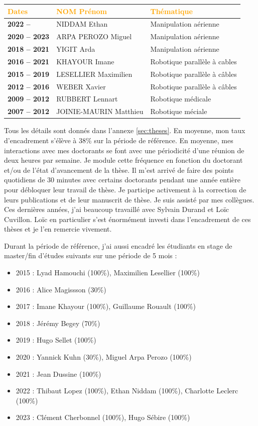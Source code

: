 \documentclass[a4paper,12pt]{article}
\begin{document}
\begin{table}[htbp]
\label{tab:liste_theses}
\centering
\begin{tabular}{>{\bfseries}lll}
\toprule
\textup{\textcolor{orange}{Dates}} & \textcolor{orange}{NOM Prénom} & \textcolor{orange}{Thématique}\\
\midrule
2022 -- & NIDDAM Ethan & Manipulation aérienne\\
2020 -- 2023 & ARPA PEROZO Miguel & Manipulation aérienne\\
2018 -- 2021 & YIGIT Arda & Manipulation aérienne\\
2016 -- 2021 & KHAYOUR Imane & Robotique parallèle à cables\\
2015 -- 2019 & LESELLIER Maximilien & Robotique parallèle à câbles\\
2012 -- 2016 & WEBER Xavier & Robotique parallèle à câbles\\
2009 -- 2012 & RUBBERT Lennart & Robotique médicale\\
2007 -- 2012 & JOINIE-MAURIN Matthieu & Robotique méciale\\
\bottomrule
\end{tabular}
\end{table}

Tous les détails sont donnés dans l'annexe \ref{sec:theses}. En moyenne, mon taux d'encadrement s'élève à 38\% sur la période de référence. En moyenne, mes interactions avec mes doctorants se font avec une périodicité d'une réunion de deux heures par semaine. Je module cette fréquence en fonction du doctorant et/ou de l'état d'avancement de la thèse. Il m'est arrivé de faire des points quotidiens de 30 minutes avec certains doctorants pendant une année entière pour débloquer leur travail de thèse. Je participe activement à la correction de leurs publications et de leur manuscrit de thèse. Je suis assisté par mes collègues. Ces dernières années, j'ai beaucoup travaillé avec Sylvain Durand et Loïc Cuvillon. Loïc en particulier s'est énormément investi dans l'encadrement de ces thèses et je l'en remercie vivement.

Durant la période de référence, j’ai aussi encadré les étudiants en stage de master/fin d’études suivants sur une période de 5 mois :
\begin{itemize}
    \item 2015 : Lyad Hamouchi (100\%), Maximilien Lesellier (100\%)
    \item 2016 : Alice Magissson (30\%)
    \item 2017 : Imane Khayour (100\%), Guillaume Rouault (100\%)
    \item 2018 : Jérémy Begey (70\%)
    \item 2019 : Hugo Sellet (100\%)
    \item 2020 : Yannick Kuhn (30\%), Miguel Arpa Perozo (100\%)
    \item 2021 : Jean Dussine (100\%)
    \item 2022 : Thibaut Lopez (100\%), Ethan Niddam (100\%), Charlotte Leclerc (100\%)
    \item 2023 : Clément Cherbonnel (100\%), Hugo Sébire (100\%)
\end{itemize}
\end{document}

